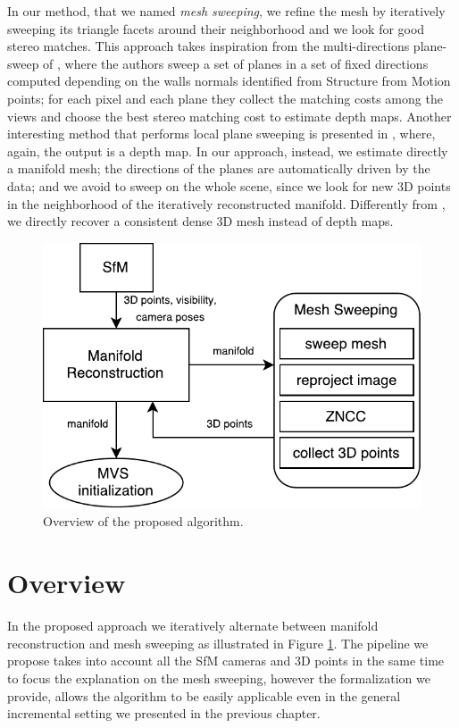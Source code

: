 In our method, that we named \emph{mesh sweeping}, we refine the mesh by iteratively sweeping its triangle facets around their neighborhood and we look for good stereo matches.
This approach takes inspiration from the multi-directions plane-sweep of \cite{gallup2007real}, where the authors sweep a set of planes in a set of fixed directions computed depending on the walls normals identified from Structure from Motion points; for each pixel and each plane they collect the matching costs among the views and choose the best stereo matching cost to estimate depth maps.
Another interesting method that performs local plane sweeping is presented in \cite{sinha2014efficient}, where, again, the output is a depth map.
In our approach, instead, we estimate directly a manifold mesh; the directions of the planes are automatically driven by the data; and we avoid to sweep on the whole scene, since we look for new 3D points in the neighborhood of the iteratively reconstructed manifold. 
Differently from \cite{gallup2007real}, we directly recover a consistent dense 3D mesh instead of depth maps.

\begin{figure}[t]
  \centering
  \includegraphics[width=0.9\columnwidth]{./img/ch-sweep/mesh-sweeping_overview}
\caption{Overview of the proposed algorithm.}
  \label{fig:overview}
\end{figure}


\section{Overview}
\label{sec:overview_sweep}
In the proposed approach we iteratively alternate between manifold reconstruction and mesh sweeping as illustrated in Figure \ref{fig:overview}.
The pipeline we propose takes into account all the SfM cameras and 3D points in the same time to focus the explanation on the mesh sweeping, however the formalization we provide, allows the algorithm to be easily applicable even in the general incremental setting we presented in the previous chapter.

